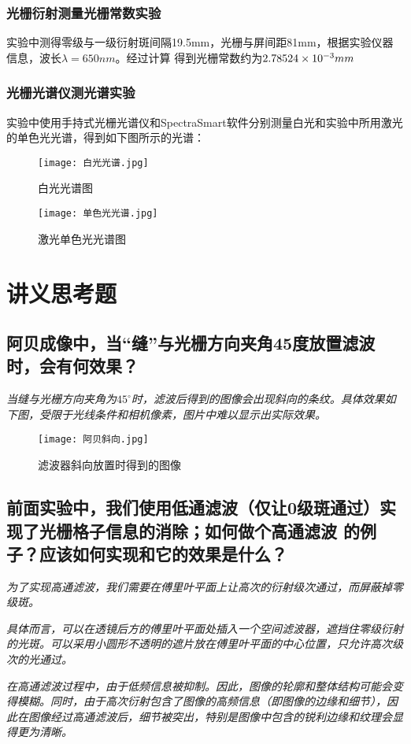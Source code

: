 \documentclass[UTF-8,twoside,cs4size]{ctexart}
\begin{document}
\subsubsection{光栅衍射测量光栅常数实验}
实验中测得零级与一级衍射斑间隔19.5mm，光栅与屏间距81mm，根据实验仪器信息，波长$\lambda=650nm$。经过计算
得到光栅常数约为$2.78524 \times {10^{{\rm{ - }}3}}mm$

\subsubsection{光栅光谱仪测光谱实验}
实验中使用手持式光栅光谱仪和SpectraSmart软件分别测量白光和实验中所用激光的单色光光谱，得到如下图所示的光谱：
\begin{figure}[!h]
    \centering
    \texttt{[image: 白光光谱.jpg]}
    \caption{白光光谱图}
\end{figure}
\begin{figure}[!h]
    \centering
    \texttt{[image: 单色光光谱.jpg]}
    \caption{激光单色光光谱图}
\end{figure}

\section{讲义思考题}
\subsection{阿贝成像中，当“缝”与光栅方向夹角45度放置滤波时，会有何效果？}
\textit{当缝与光栅方向夹角为$45^{\circ}$时，滤波后得到的图像会出现斜向的条纹。具体效果如下图，受限于光线条件和相机像素，图片中难以显示出实际效果。}
\newpage
\begin{figure}[!h]
    \centering
    \texttt{[image: 阿贝斜向.jpg]}
    \caption{滤波器斜向放置时得到的图像}
\end{figure}
\subsection{前面实验中，我们使用低通滤波（仅让0级斑通过）实现了光栅格子信息的消除；如何做个高通滤波
的例子？应该如何实现和它的效果是什么？ }
\textit{为了实现高通滤波，我们需要在傅里叶平面上让高次的衍射级次通过，而屏蔽掉零级斑。}

\textit{具体而言，可以在透镜后方的傅里叶平面处插入一个空间滤波器，遮挡住零级衍射的光斑。可以采用小圆形不透明的遮片放在傅里叶平面的中心位置，只允许高次级次的光通过。}

\textit{在高通滤波过程中，由于低频信息被抑制。因此，图像的轮廓和整体结构可能会变得模糊。同时，由于高次衍射包含了图像的高频信息（即图像的边缘和细节），因此在图像经过高通滤波后，细节被突出，特别是图像中包含的锐利边缘和纹理会显得更为清晰。}
\end{document}
